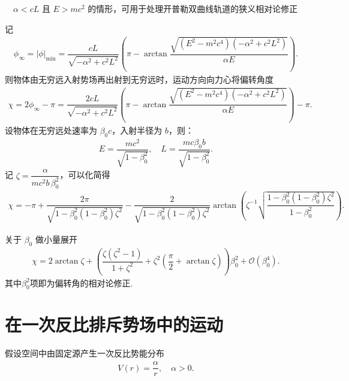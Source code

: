 \begin{exbox}
	\(\quad\alpha < cL\) 且 \(E > mc^2\) 的情形，可用于处理开普勒双曲线轨道的狭义相对论修正

	记
	\begin{align*}
		\phi_{\infty} = |\phi|_{\text{min}} = \dfrac{cL}{\sqrt{-\alpha^2 + c^2 L^2}} \left(\pi - \arctan \dfrac{\sqrt{(E^2 - m^2 c^4) (-\alpha^2 + c^2 L^2)}}{\alpha E}\right).
	\end{align*}
	则物体由无穷远入射势场再出射到无穷远时，运动方向向力心将偏转角度
	\begin{align*}
		\chi = 2 \phi_{\infty} - \pi = \dfrac{2 cL}{\sqrt{-\alpha^2 + c^2 L^2}} \left(\pi - \arctan \dfrac{\sqrt{(E^2 - m^2 c^4) (-\alpha^2 + c^2 L^2)}}{\alpha E}\right) - \pi.
	\end{align*}
	设物体在无穷远处速率为 \(\beta_0 c\)，入射半径为 \(b\)，则：
	\begin{align*}
		E = \dfrac{mc^2}{\sqrt{1 - \beta_0^2}}, \quad
		L = \dfrac{mc \beta_0 b}{\sqrt{1 - \beta_0^2}}.
	\end{align*}
	记 \(\zeta = \dfrac{\alpha}{mc^2 b\, \beta_0^2}\)，可以化简得
	\begin{align*}
		\chi = -\pi + \dfrac{2 \pi}{\sqrt{1 - \beta_0^2 (1 - \beta_0^2) \zeta^2}} - \dfrac{2}{\sqrt{1 - \beta_0^2 (1 - \beta_0^2) \zeta^2}} \arctan \left(\zeta^{-1} \sqrt{\dfrac{1 - \beta_0^2 (1 - \beta_0^2) \zeta^2}{1 - \beta_0^2}}\right).
	\end{align*}

	关于 \(\beta_0\) 做小量展开
	\begin{align*}
		\chi = 2 \arctan\zeta + \left( \dfrac{\zeta (\zeta^2 - 1)}{1 + \zeta^2} + \zeta^2 \left( \dfrac{\pi}{2} + \arctan\zeta \right) \right) \beta_0^2 + \mathcal{O} (\beta_0^4).
	\end{align*}
	其中\(\beta_0^2\)项即为偏转角的相对论修正.
\end{exbox}

\section{在一次反比排斥势场中的运动}
假设空间中由固定源产生一次反比势能分布
\begin{align*}
	V(r) = \dfrac{\alpha}{r}, \quad \alpha > 0.
\end{align*}

